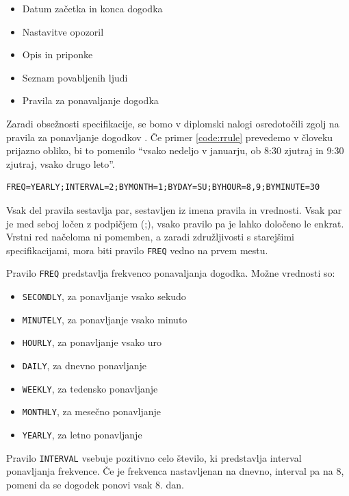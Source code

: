 \begin{itemize}
  \item Datum začetka in konca dogodka
  \item Nastavitve opozoril
  \item Opis in priponke
  \item Seznam povabljenih ljudi
  \item Pravila za ponavaljanje dogodka
\end{itemize}

Zaradi obsežnosti specifikacije, se bomo v diplomski nalogi osredotočili zgolj na pravila za ponavljanje dogodkov \cite{rrule}. Če primer \ref{code:rrule} prevedemo v človeku prijazno obliko, bi to pomenilo ``vsako nedeljo v januarju, ob 8:30 zjutraj in 9:30 zjutraj, vsako drugo leto''.

\begin{lstlisting}[caption=Primer uporabe pravila RRULE spefikiacije RFC 5545., label=code:rrule]
FREQ=YEARLY;INTERVAL=2;BYMONTH=1;BYDAY=SU;BYHOUR=8,9;BYMINUTE=30
\end{lstlisting}

Vsak del pravila sestavlja par, sestavljen iz imena pravila in vrednosti. Vsak par je med seboj ločen z podpičjem (;), vsako pravilo pa je lahko določeno le enkrat. Vrstni red načeloma ni pomemben, a zaradi združljivosti s starejšimi specifikacijami, mora biti pravilo \texttt{FREQ} vedno na prvem mestu.

Pravilo \texttt{FREQ} predstavlja frekvenco ponavaljanja dogodka. Možne vrednosti so:

\begin{itemize}
  \item \texttt{SECONDLY}, za ponavljanje vsako sekudo
  \item \texttt{MINUTELY}, za ponavljanje vsako minuto
  \item \texttt{HOURLY}, za ponavljanje vsako uro
  \item \texttt{DAILY}, za dnevno ponavljanje
  \item \texttt{WEEKLY}, za tedensko ponavljanje
  \item \texttt{MONTHLY}, za mesečno ponavljanje
  \item \texttt{YEARLY}, za letno ponavljanje
\end{itemize}

Pravilo \texttt{INTERVAL} vsebuje pozitivno celo število, ki predstavlja interval ponavljanja frekvence. Če je frekvenca nastavljenan na dnevno, interval pa na 8, pomeni da se dogodek ponovi vsak 8. dan.


